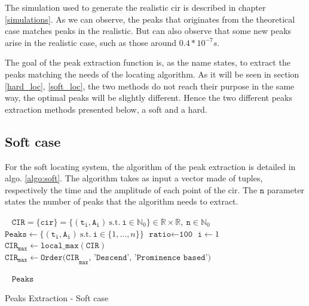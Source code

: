 The simulation used to generate the realistic \gls{cir} is described in chapter \ref{simulations}. As we can observe, the peaks that originates from the theoretical case matches peaks in the realistic. But can also observe that some new peaks arise in the realistic case, such as those around $0.4*10^{-7}s$. 
\vspace{2mm}

The goal of the peak extraction function is, as the name states, to extract the peaks matching the needs of the locating algorithm. As it will be seen in section \ref{hard_loc}, \ref{soft_loc}, the two methods do not reach their purpose in the same way, the optimal peaks will be slightly different. Hence the two different peaks extraction methods presented below, a soft and a hard.

\subsection{Soft case}

For the soft locating system, the algorithm of the peak extraction is detailed in algo. \ref{algo:soft}. The algorithm takes as input a vector made of tuples, respectively the time and the amplitude of each point of the \gls{cir}. The $\texttt{n}$ parameter states the number of peaks that the algorithm needs to extract.
\vspace{2mm}


\begin{algorithm}[H]
 \KwInput{}\
 \hspace*{\algorithmicindent} $\mathtt{CIR} = \{\mathtt{cir}\} = \{ (\mathtt{t_i}, \mathtt{A_i}) ~\text{s.t.} ~\mathtt{i} \in \mathbb{N}_0\} \in \mathbb{R} \times \mathbb{R}, ~\mathtt{n} \in \mathbb{N}_0$ \;
\KwInit{}
\hspace*{\algorithmicindent} $\texttt{Peaks} \longleftarrow \{ (\mathtt{t_i}, \mathtt{A_i}) ~\text{s.t.} ~\mathtt{i} \in \{ 1, ..., n \} \}$\;
\hspace*{\algorithmicindent} $\texttt{ratio} \longleftarrow \texttt{100}$\;
\hspace*{\algorithmicindent} $\texttt{i} \longleftarrow 1$\;
\hspace*{\algorithmicindent} $\texttt{CIR}_\texttt{max} \longleftarrow \texttt{local\_max}(\texttt{CIR})$\;
\hspace*{\algorithmicindent} $\texttt{CIR}_\texttt{max} \longleftarrow \texttt{Order(CIR}_\texttt{max}\texttt{, 'Descend', 'Prominence based')}$\;


 \KwOutput{}\
 \hspace*{\algorithmicindent} $\texttt{Peaks}$\;
 \caption{Peaks Extraction - Soft case \label{algo:soft}}
\end{algorithm}
\vspace{2mm}

